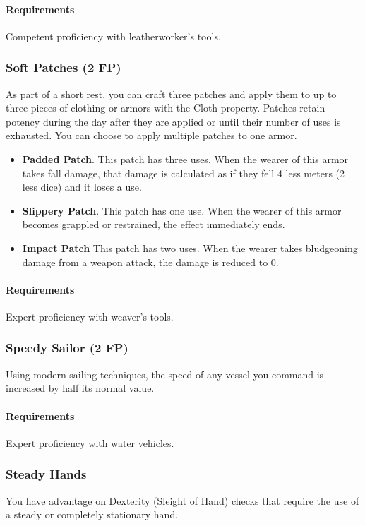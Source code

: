     \paragraph{Requirements} Competent proficiency with leatherworker's tools.
\subsubsection{Soft Patches (2 FP)} \label{feat::softpatches}
    As part of a short rest, you can craft three patches and apply them to up to three pieces of clothing or armors with the Cloth property.
    Patches retain potency during the day after they are applied or until their number of uses is exhausted.
    You can choose to apply multiple patches to one armor.
    \begin{itemize}
        \item \textbf{Padded Patch}.
            This patch has three uses.
            When the wearer of this armor takes fall damage, that damage is calculated as if they fell 4 less meters (2 less dice) and it loses a use.
        \item \textbf{Slippery Patch}.
            This patch has one use.
            When the wearer of this armor becomes grappled or restrained, the effect immediately ends.
        \item \textbf{Impact Patch}
            This patch has two uses.
            When the wearer takes bludgeoning damage from a weapon attack, the damage is reduced to 0.
    \end{itemize}
    \paragraph{Requirements} Expert proficiency with weaver's tools.
\subsubsection{Speedy Sailor (2 FP)} \label{feat::speedysailor}
    Using modern sailing techniques, the speed of any vessel you command is increased by half its normal value.
    \paragraph{Requirements} Expert proficiency with water vehicles.
\subsubsection{Steady Hands} \label{feat::steadyhands}
    You have advantage on Dexterity (Sleight of Hand) checks that require the use of a steady or completely stationary hand.
